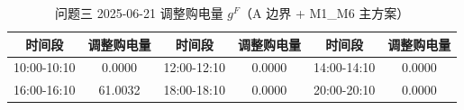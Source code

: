 \begin{table}[htbp]
\centering
\caption{问题三 2025-06-21 调整购电量 $g^F$（A 边界 + M1\_M6 主方案）}\label{tab:q3-adjust}
\normalsize\setlength{\tabcolsep}{5pt}
\begin{tabular}{@{}cccccc@{}}
\toprule
时间段 & 调整购电量 & 时间段 & 调整购电量 & 时间段 & 调整购电量 \\
\midrule
10:00-10:10 & 0.0000 & 12:00-12:10 & 0.0000 & 14:00-14:10 & 0.0000 \\
16:00-16:10 & 61.0032 & 18:00-18:10 & 0.0000 & 20:00-20:10 & 0.0000 \\
\bottomrule
\end{tabular}
\end{table}
